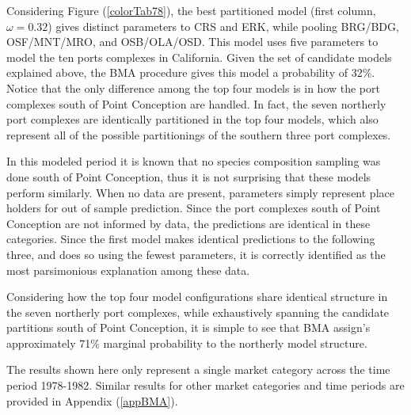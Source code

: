\documentclass[12pt]{article}
\begin{document}


Considering Figure (\ref{colorTab78}), the best partitioned model
(first column, \(\omega=0.32\)) gives distinct parameters to CRS and
ERK, while pooling BRG/BDG, OSF/MNT/MRO, and OSB/OLA/OSD. This model
uses five parameters to model the ten ports complexes in California.
Given the set of candidate models explained above, the BMA procedure
gives this model a probability of 32\%. Notice that the only difference among 
the top four models is in how the port complexes south of Point Conception are 
handled. In fact, the seven northerly port complexes are identically 
partitioned in the top four models, which also represent all of the possible 
partitionings of the southern three port complexes.

In this modeled period it is known that no species composition sampling
was done south of Point Conception, thus it is not surprising that these
models perform similarly. When no data are present, parameters simply
represent place holders for out of sample prediction. Since the port
complexes south of Point Conception are not informed by data, the
predictions are identical in these categories. Since the first model
makes identical predictions to the following three, and does so using
the fewest parameters, it is correctly identified as the most
parsimonious explanation among these data.

Considering how the top four model configurations share identical
structure in the seven northerly port complexes, while exhaustively
spanning the candidate partitions south of Point Conception, it is
simple to see that BMA assign's approximately 71\% marginal probability
to the northerly model structure.

The results shown here only represent a single market category across
the time period 1978-1982. Similar results for other market categories
and time periods are provided in Appendix (\ref{appBMA}).
\end{document}
